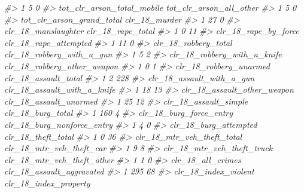 \documentclass[
]{krantz}
\makeatletter
\newenvironment{Shaded}{\begin{snugshade}}{\end{snugshade}}
\newcommand{\CommentTok}[1]{\textcolor[rgb]{0.37,0.37,0.37}{\textit{#1}}}
\newenvironment{kframe}{%
\medskip{}
\setlength{\fboxsep}{.8em}
 \def\at@end@of@kframe{}%
 \ifinner\ifhmode%
  \def\at@end@of@kframe{\end{minipage}}%
  \begin{minipage}{\columnwidth}%
 \fi\fi%
 \def\FrameCommand##1{\hskip\@totalleftmargin \hskip-\fboxsep
 \colorbox{shadecolor}{##1}\hskip-\fboxsep
     \hskip-\linewidth \hskip-\@totalleftmargin \hskip\columnwidth}%
 \MakeFramed {\advance\hsize-\width
   \@totalleftmargin\z@ \linewidth\hsize
   \@setminipage}}%
 {\par\unskip\endMakeFramed%
 \at@end@of@kframe}
\renewenvironment{Shaded}{\begin{kframe}}{\end{kframe}}
\makeatother
\begin{document}
\begin{Shaded}
\begin{Highlighting}[]
\CommentTok{\#\textgreater{} 1                            5                          0}
\CommentTok{\#\textgreater{}   tot\_clr\_arson\_total\_mobile tot\_clr\_arson\_all\_other}
\CommentTok{\#\textgreater{} 1                          5                       0}
\CommentTok{\#\textgreater{}   tot\_clr\_arson\_grand\_total clr\_18\_murder}
\CommentTok{\#\textgreater{} 1                        27             0}
\CommentTok{\#\textgreater{}   clr\_18\_manslaughter clr\_18\_rape\_total}
\CommentTok{\#\textgreater{} 1                   0                11}
\CommentTok{\#\textgreater{}   clr\_18\_rape\_by\_force clr\_18\_rape\_attempted}
\CommentTok{\#\textgreater{} 1                   11                     0}
\CommentTok{\#\textgreater{}   clr\_18\_robbery\_total clr\_18\_robbery\_with\_a\_gun}
\CommentTok{\#\textgreater{} 1                    5                         2}
\CommentTok{\#\textgreater{}   clr\_18\_robbery\_with\_a\_knife clr\_18\_robbery\_other\_weapon}
\CommentTok{\#\textgreater{} 1                           0                           1}
\CommentTok{\#\textgreater{}   clr\_18\_robbery\_unarmed clr\_18\_assault\_total}
\CommentTok{\#\textgreater{} 1                      2                  228}
\CommentTok{\#\textgreater{}   clr\_18\_assault\_with\_a\_gun clr\_18\_assault\_with\_a\_knife}
\CommentTok{\#\textgreater{} 1                        18                          13}
\CommentTok{\#\textgreater{}   clr\_18\_assault\_other\_weapon clr\_18\_assault\_unarmed}
\CommentTok{\#\textgreater{} 1                          25                     12}
\CommentTok{\#\textgreater{}   clr\_18\_assault\_simple clr\_18\_burg\_total}
\CommentTok{\#\textgreater{} 1                   160                 4}
\CommentTok{\#\textgreater{}   clr\_18\_burg\_force\_entry clr\_18\_burg\_nonforce\_entry}
\CommentTok{\#\textgreater{} 1                       4                          0}
\CommentTok{\#\textgreater{}   clr\_18\_burg\_attempted clr\_18\_theft\_total}
\CommentTok{\#\textgreater{} 1                     0                 36}
\CommentTok{\#\textgreater{}   clr\_18\_mtr\_veh\_theft\_total clr\_18\_mtr\_veh\_theft\_car}
\CommentTok{\#\textgreater{} 1                          9                        8}
\CommentTok{\#\textgreater{}   clr\_18\_mtr\_veh\_theft\_truck clr\_18\_mtr\_veh\_theft\_other}
\CommentTok{\#\textgreater{} 1                          1                          0}
\CommentTok{\#\textgreater{}   clr\_18\_all\_crimes clr\_18\_assault\_aggravated}
\CommentTok{\#\textgreater{} 1               295                        68}
\CommentTok{\#\textgreater{}   clr\_18\_index\_violent clr\_18\_index\_property}

\end{Highlighting}
\end{Shaded}
\end{document}

